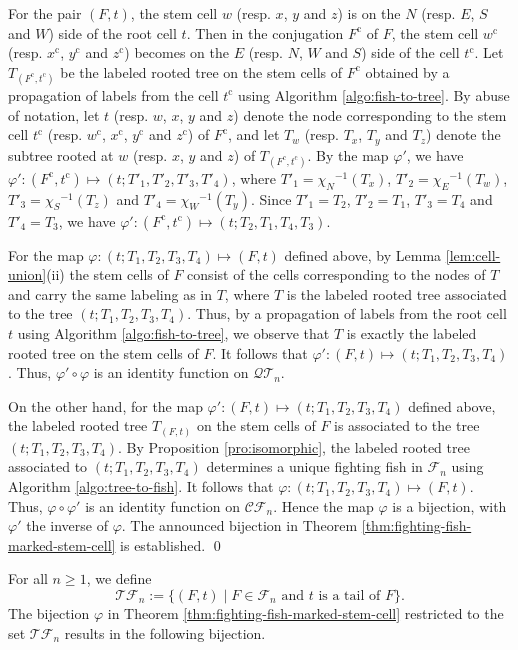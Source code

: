 \documentclass[a4paper,11pt,reqno]{amsart}
\theoremstyle{definition}
\numberwithin{equation}{section}
\newcommand{\cc}{{\mathrm{c}}}
\newcommand{\CF}{{\mathcal{CF}}}
\newcommand{\TF}{{\mathcal{TF}}}
\newcommand{\QT}{{\mathcal{QT}}}
\newcommand{\F}{{\mathcal{F}}}
\begin{document}
For the pair $(F,t)$, the stem cell $w$ (resp. $x$, $y$ and $z$) is on the $N$ (resp. $E$, $S$ and $W$) side of the root cell $t$. Then in the conjugation $F^{\cc}$ of $F$, the stem cell $w^{\cc}$ (resp. $x^{\cc}$, $y^{\cc}$ and $z^{\cc}$) becomes on the $E$ (resp. $N$, $W$ and $S$) side of the cell $t^{\cc}$. Let $T_{(F^{\cc},t^{\cc})}$ be the labeled rooted tree on the stem cells of $F^{\cc}$ obtained by a propagation of labels from the cell $t^{\cc}$ using Algorithm \ref{algo:fish-to-tree}.
By abuse of notation, let $t$ (resp. $w$, $x$, $y$ and $z$) denote the node corresponding to the stem cell $t^{\cc}$ (resp. $w^{\cc}$, $x^{\cc}$, $y^{\cc}$ and $z^{\cc}$) of $F^{\cc}$, and let $T_w$ (resp. $T_x$, $T_y$ and $T_z$) denote the subtree rooted at $w$ (resp. $x$, $y$ and $z$) of $T_{(F^{\cc},t^{\cc})}$. By the map $\varphi'$, we have $\varphi':(F^{\cc},t^{\cc})\mapsto (t;T'_1,T'_2,T'_3,T'_4)$, where $T'_1={\chi_N}^{-1}(T_x)$, $T'_2={\chi_E}^{-1}(T_w)$, $T'_3={\chi_S}^{-1}(T_z)$ and $T'_4={\chi_W}^{-1}(T_y)$. Since $T'_1=T_2$, $T'_2=T_1$, $T'_3=T_4$ and $T'_4=T_3$, we have $\varphi':(F^{\cc},t^{\cc})\mapsto (t;T_2,T_1,T_4,T_3)$.


For the map $\varphi:(t;T_1,T_2,T_3,T_4)\mapsto (F,t)$ defined above, by Lemma \ref{lem:cell-union}(ii) the stem cells of $F$ consist of the cells corresponding to the nodes of $T$ and carry the same labeling as in $T$, where $T$ is the labeled rooted tree associated to the tree $(t;T_1,T_2,T_3,T_4)$.  Thus, by a propagation of labels from the root cell $t$ using Algorithm \ref{algo:fish-to-tree}, we observe that $T$ is exactly the labeled rooted tree on the stem cells of $F$. It follows that $\varphi':(F,t)\mapsto (t;T_1,T_2,T_3,T_4)$. Thus, $\varphi'\circ\varphi$ is an identity function on $\QT_n$.


On the other hand, for the map $\varphi':(F,t)\mapsto (t;T_1,T_2,T_3,T_4)$ defined above, the labeled rooted tree $T_{(F,t)}$ on the stem cells of $F$ is associated to the tree $(t;T_1,T_2,T_3,T_4)$. By Proposition \ref{pro:isomorphic}, the labeled rooted tree associated to $(t;T_1,T_2,T_3,T_4)$ determines a unique fighting fish in $\F_n$ using Algorithm \ref{algo:tree-to-fish}. It follows that $\varphi:(t;T_1,T_2,T_3,T_4)\mapsto (F,t)$. Thus, $\varphi\circ\varphi'$ is an identity function on $\CF_n$. Hence the map $\varphi$ is a bijection, with $\varphi'$ the inverse of $\varphi$. The announced bijection in Theorem \ref{thm:fighting-fish-marked-stem-cell} is established. 
\qed

\medskip
For all $n\ge 1$, we define
\begin{equation}
\TF_n:=\{(F,t)\mid F\in\F_n\mbox{ and $t$ is a tail of $F$}\}.
\end{equation}
The bijection $\varphi$ in Theorem \ref{thm:fighting-fish-marked-stem-cell} restricted to the set $\TF_n$ results in the following bijection. 
\end{document}
